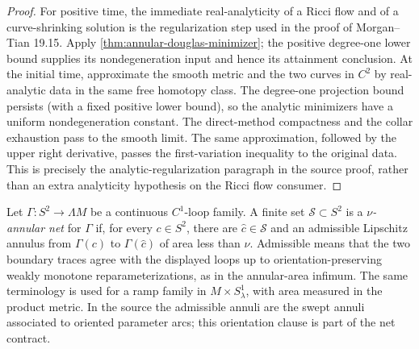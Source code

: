 \begin{proof}
For positive time, the immediate real-analyticity of a Ricci flow and of a
curve-shrinking solution is the regularization step used in the proof of
Morgan--Tian 19.15.  Apply
\ref{thm:annular-douglas-minimizer}; the positive degree-one lower bound
supplies its nondegeneration input and hence its attainment conclusion.  At
the initial time, approximate the
smooth metric and the two curves in $C^2$ by real-analytic data in the same
free homotopy class.  The degree-one projection bound persists (with a fixed
positive lower bound), so the analytic minimizers have a uniform
nondegeneration constant.  The direct-method compactness and the collar
exhaustion pass to the smooth limit.  The same approximation, followed by
the upper right derivative, passes the first-variation inequality to the
original data.  This is precisely the analytic-regularization paragraph in
the source proof, rather than an extra analyticity hypothesis on the Ricci
flow consumer.
\end{proof}

\begin{definition}
\label{def:finite-small-annulus-net}
\notready
Let $\Gamma\colon S^2\to\Lambda M$ be a continuous $C^1$-loop family.  A
finite set ${\mathcal S}\subset S^2$ is a \emph{$\nu$-annular net} for
$\Gamma$ if, for every $c\in S^2$, there are $\widehat c\in{\mathcal S}$ and
an admissible Lipschitz annulus from $\Gamma(c)$ to $\Gamma(\widehat c)$ of
area less than $\nu$.  Admissible means that the two boundary traces agree
with the displayed loops up to orientation-preserving weakly monotone
reparameterizations, as in the annular-area infimum.  The same terminology is
used for a ramp family in $M\times S^1_\lambda$, with area measured in the
product metric.  In the source the admissible annuli are the swept annuli
associated to oriented parameter arcs; this orientation clause is part of the
net contract.
\end{definition}

